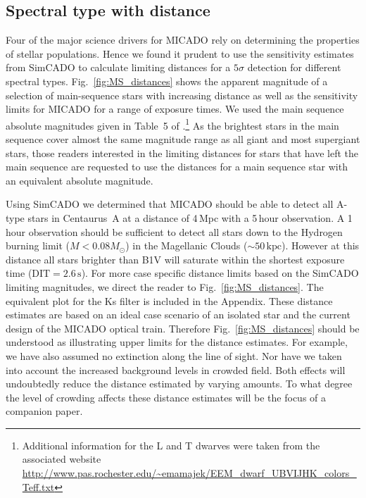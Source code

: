 \subsection{Spectral type with distance}


Four of the major science drivers for MICADO rely on determining the properties of stellar populations. Hence we found it prudent to use the sensitivity estimates from SimCADO to calculate limiting distances for a $5\sigma$ detection for different spectral types. Fig.~\ref{fig:MS_distances} shows the apparent magnitude of a selection of main-sequence stars with increasing distance as well as the sensitivity limits for MICADO for a range of exposure times. 
We used the main sequence absolute magnitudes given in Table~5 of \citet{pecaut2013}.\footnote{Additional information for the L and T dwarves \citep[not reported by][]{pecaut2013} were taken from the associated website \url{http://www.pas.rochester.edu/~emamajek/EEM_dwarf_UBVIJHK_colors_Teff.txt}} As the brightest stars in the main sequence cover almost the same magnitude range as all giant and most supergiant stars, those readers interested in the limiting distances for stars that have left the main sequence are requested to use the distances for a main sequence star with an equivalent absolute magnitude. 

Using SimCADO we determined that MICADO should be able to detect all A-type stars in Centaurus~A at a distance of 4\,Mpc with a 5\,hour observation. A 1\,hour observation should be sufficient to detect all stars down to the Hydrogen burning limit ($M < 0.08 M_{\odot}$) in the Magellanic Clouds ($\sim 50\,\mathrm{kpc}$). However at this distance all stars brighter than B1V will saturate within the shortest exposure time ($\mathrm{DIT} =2.6\,\mathrm{s}$). For more case specific distance limits based on the SimCADO limiting magnitudes, we direct the reader to Fig.~\ref{fig:MS_distances}. The equivalent plot for the Ks filter is included in the Appendix. These distance estimates are based on an ideal case scenario of an isolated star and the current design of the MICADO optical train. Therefore Fig.~\ref{fig:MS_distances} should be understood as illustrating upper limits for the distance estimates. For example, we have also assumed no extinction along the line of sight. Nor have we taken into account the increased background levels in crowded field. Both effects will undoubtedly reduce the distance estimated by varying amounts. To what degree the level of crowding affects these distance estimates will be the focus of a companion paper.


